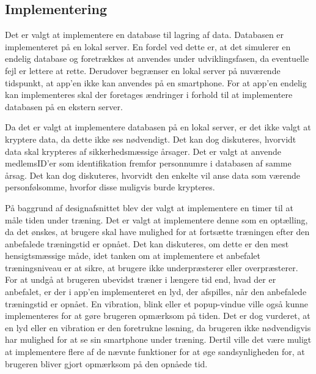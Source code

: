 \subsection{Implementering}
Det er valgt at implementere en database til lagring af data. Databasen er 
implementeret på en lokal server. En fordel ved dette er, at det simulerer en endelig database og foretrækkes at anvendes under udviklingsfasen, da eventuelle fejl er lettere at rette. Derudover begrænser en lokal server på nuværende tidspunkt, at app’en ikke kan anvendes på en smartphone. For at app’en endelig kan implementeres skal der foretages ændringer i forhold til at implementere databasen på en ekstern server.


Da det er valgt at implementere databasen på en lokal server, er det ikke valgt at kryptere data, da dette ikke ses nødvendigt. Det kan dog diskuteres, hvorvidt data skal krypteres af sikkerhedsmæssige årsager. Det er valgt at anvende medlemsID’er som identifikation fremfor personnumre i databasen af samme årsag. Det kan dog diskuteres, hvorvidt den enkelte vil anse data som værende personfølsomme, hvorfor disse muligvis burde krypteres. 

På baggrund af designafsnittet blev der valgt at implementere en timer til at måle tiden under træning. Det er valgt at implementere denne som en optælling, da det ønskes, at brugere skal have mulighed for at fortsætte træningen efter den anbefalede træningstid er opnået. Det kan diskuteres, om dette er den mest hensigtsmæssige måde, idet tanken om at implementere et anbefalet træningsniveau er at sikre, at brugere ikke underpræsterer eller overpræsterer. For at undgå at brugeren ubevidst træner i længere tid end, hvad der er anbefalet, er der i app'en implementeret en lyd, der afspilles, når den anbefalede træningstid er opnået. En vibration, blink eller et popup-vindue ville også kunne implementeres for at gøre brugeren opmærksom på tiden. Det er dog vurderet, at en lyd eller en vibration er den foretrukne løsning, da brugeren ikke nødvendigvis har mulighed for at se sin smartphone under træning. Dertil ville det være muligt at implementere flere af de nævnte funktioner for at øge sandsynligheden for, at brugeren bliver gjort opmærksom på den opnåede tid. 



